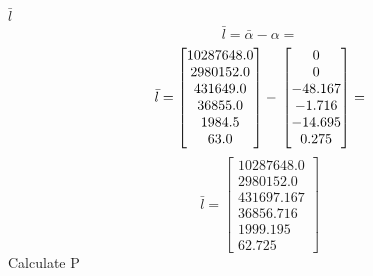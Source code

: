 $\bar l$
\begin{equation}
  \bar l = \bar \alpha - \alpha = 
\end{equation}
\begin{equation}
  \bar l = \left[\begin{matrix}10287648.0\\2980152.0\\431649.0\\36855.0\\1984.5\\63.0\end{matrix}\right] - \\\left[\begin{matrix}0\\0\\-48.167\\-1.716\\-14.695\\0.275\end{matrix}\right] = 
\end{equation}
\begin{equation}
  \bar l = \left[\begin{matrix}10287648.0\\2980152.0\\431697.167\\36856.716\\1999.195\\62.725\end{matrix}\right]
\end{equation}
Calculate P
